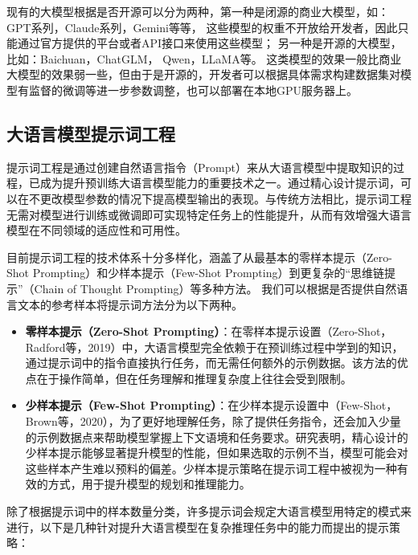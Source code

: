 现有的大模型根据是否开源可以分为两种，第一种是闭源的商业大模型，如：GPT系列\cite{achiam2023gpt, OpenAI2023}，Claude系列\cite{anthropic2023claude3}，Gemini\cite{team2023gemini, team2024gemini}等等，
这些模型的权重不开放给开发者，因此只能通过官方提供的平台或者API接口来使用这些模型；
另一种是开源的大模型，比如：Baichuan\cite{Yang2023}，ChatGLM\cite{Zeng2023}，
Qwen\cite{yang2024qwen2}，LLaMA\cite{Touvron2023}等。
这类模型的效果一般比商业大模型的效果弱一些，但由于是开源的，开发者可以根据具体需求构建数据集对模型有监督的微调等进一步参数调整，也可以部署在本地GPU服务器上。

\subsection{大语言模型提示词工程}

提示词工程是通过创建自然语言指令（Prompt）来从大语言模型中提取知识的过程，已成为提升预训练大语言模型能力的重要技术之一。通过精心设计提示词，可以在不更改模型参数的情况下提高模型输出的表现。与传统方法相比，提示词工程无需对模型进行训练或微调即可实现特定任务上的性能提升，从而有效增强大语言模型在不同领域的适应性和可用性。

目前提示词工程的技术体系十分多样化，涵盖了从最基本的零样本提示（Zero-Shot Prompting）和少样本提示（Few-Shot Prompting）到更复杂的“思维链提示”（Chain of Thought Prompting）等多种方法。
我们可以根据是否提供自然语言文本的参考样本将提示词方法分为以下两种。

\begin{itemize}
    \item \textbf{零样本提示（Zero-Shot Prompting）}：在零样本提示设置（Zero-Shot，Radford等，2019）中，大语言模型完全依赖于在预训练过程中学到的知识，通过提示词中的指令直接执行任务，而无需任何额外的示例数据。该方法的优点在于操作简单，但在任务理解和推理复杂度上往往会受到限制。
    \item \textbf{少样本提示（Few-Shot Prompting）}：在少样本提示设置中（Few-Shot，Brown等，2020），为了更好地理解任务，除了提供任务指令，还会加入少量的示例数据点来帮助模型掌握上下文语境和任务要求。研究表明，精心设计的少样本提示能够显著提升模型的性能，但如果选取的示例不当，模型可能会对这些样本产生难以预料的偏差。少样本提示策略在提示词工程中被视为一种有效的方式，用于提升模型的规划和推理能力。
\end{itemize}

除了根据提示词中的样本数量分类，许多提示词会规定大语言模型用特定的模式来进行，以下是几种针对提升大语言模型在复杂推理任务中的能力而提出的提示策略：

